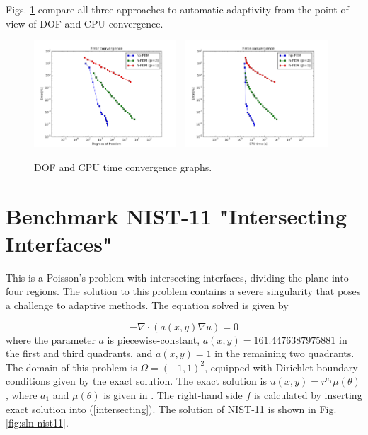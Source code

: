 \documentclass[12pt]{elsarticle}
\begin{document}
Figs. \ref{fig:nist-10-conv} compare all
three approaches to automatic adaptivity from the point
of view of DOF and CPU convergence.

\begin{figure}[!ht]
\centering
\includegraphics[height=4cm]{nist/nist-10/conv_dof_aniso.png}\ \
\includegraphics[height=4cm]{nist/nist-10/conv_cpu_aniso.png}
\caption{DOF and CPU time convergence graphs.}
\label{fig:nist-10-conv}
\end{figure}


\section{Benchmark NIST-11 "Intersecting Interfaces"}
\label{sec:bench-11}

This is a Poisson's problem with intersecting interfaces,
dividing the plane into four regions.
The solution to this problem contains a severe
singularity that poses a challenge to adaptive methods.
The equation solved is given by

\begin{equation} \label{intersecting}
-\nabla \cdot (a(x,y) \nabla u) = 0
\end{equation}
where the parameter $a$ is piecewise-constant,
$a(x,y) = 161.4476387975881$ in the first and third quadrants,
and $a(x,y) = 1$ in the remaining two quadrants.
The domain of this problem is $\Omega = (-1, 1)^2$, equipped with
Dirichlet boundary conditions given by the exact solution.
The exact solution is
$u(x,y) = r^{a_1} \mu (\theta)$,
where $a_1$ and $\mu (\theta)$ is given in \cite{mitchell-1}.
The right-hand side $f$ is calculated by inserting exact solution into (\ref{intersecting}).
The solution of NIST-11 is shown in Fig. \ref{fig:sln-nist11}.
\end{document}
